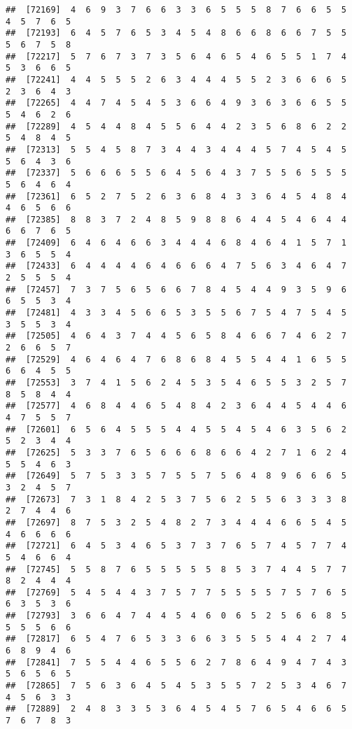 \documentclass[
]{book}
\begin{document}
\begin{verbatim}
##  [72169]  4  6  9  3  7  6  6  3  3  6  5  5  5  8  7  6  6  5  5  4  5  7  6  5
##  [72193]  6  4  5  7  6  5  3  4  5  4  8  6  6  8  6  6  7  5  5  5  6  7  5  8
##  [72217]  5  7  6  7  3  7  3  5  6  4  6  5  4  6  5  5  1  7  4  5  3  6  6  5
##  [72241]  4  4  5  5  5  2  6  3  4  4  4  5  5  2  3  6  6  6  5  2  3  6  4  3
##  [72265]  4  4  7  4  5  4  5  3  6  6  4  9  3  6  3  6  6  5  5  5  4  6  2  6
##  [72289]  4  5  4  4  8  4  5  5  6  4  4  2  3  5  6  8  6  2  2  5  4  8  4  5
##  [72313]  5  5  4  5  8  7  3  4  4  3  4  4  4  5  7  4  5  4  5  5  6  4  3  6
##  [72337]  5  6  6  6  5  5  6  4  5  6  4  3  7  5  5  6  5  5  5  5  6  4  6  4
##  [72361]  6  5  2  7  5  2  6  3  6  8  4  3  3  6  4  5  4  8  4  4  6  5  6  6
##  [72385]  8  8  3  7  2  4  8  5  9  8  8  6  4  4  5  4  6  4  4  6  6  7  6  5
##  [72409]  6  4  6  4  6  6  3  4  4  4  6  8  4  6  4  1  5  7  1  3  6  5  5  4
##  [72433]  6  4  4  4  4  6  4  6  6  6  4  7  5  6  3  4  6  4  7  2  5  5  5  4
##  [72457]  7  3  7  5  6  5  6  6  7  8  4  5  4  4  9  3  5  9  6  6  5  5  3  4
##  [72481]  4  3  3  4  5  6  6  5  3  5  5  6  7  5  4  7  5  4  5  3  5  5  3  4
##  [72505]  4  6  4  3  7  4  4  5  6  5  8  4  6  6  7  4  6  2  7  2  6  6  5  7
##  [72529]  4  6  4  6  4  7  6  8  6  8  4  5  5  4  4  1  6  5  5  6  6  4  5  5
##  [72553]  3  7  4  1  5  6  2  4  5  3  5  4  6  5  5  3  2  5  7  8  5  8  4  4
##  [72577]  4  6  8  4  4  6  5  4  8  4  2  3  6  4  4  5  4  4  6  4  7  5  5  7
##  [72601]  6  5  6  4  5  5  5  4  4  5  5  4  5  4  6  3  5  6  2  5  2  3  4  4
##  [72625]  5  3  3  7  6  5  6  6  6  8  6  6  4  2  7  1  6  2  4  5  5  4  6  3
##  [72649]  5  7  5  3  3  5  7  5  5  7  5  6  4  8  9  6  6  6  5  3  2  4  5  7
##  [72673]  7  3  1  8  4  2  5  3  7  5  6  2  5  5  6  3  3  3  8  2  7  4  4  6
##  [72697]  8  7  5  3  2  5  4  8  2  7  3  4  4  4  6  6  5  4  5  4  6  6  6  6
##  [72721]  6  4  5  3  4  6  5  3  7  3  7  6  5  7  4  5  7  7  4  5  4  6  6  4
##  [72745]  5  5  8  7  6  5  5  5  5  5  8  5  3  7  4  4  5  7  7  8  2  4  4  4
##  [72769]  5  4  5  4  4  3  7  5  7  7  5  5  5  5  7  5  7  6  5  6  3  5  3  6
##  [72793]  3  6  6  4  7  4  4  5  4  6  0  6  5  2  5  6  6  8  5  5  5  5  6  6
##  [72817]  6  5  4  7  6  5  3  3  6  6  3  5  5  5  4  4  2  7  4  6  8  9  4  6
##  [72841]  7  5  5  4  4  6  5  5  6  2  7  8  6  4  9  4  7  4  3  5  6  5  6  5
##  [72865]  7  5  6  3  6  4  5  4  5  3  5  5  7  2  5  3  4  6  7  4  5  6  3  3
##  [72889]  2  4  8  3  3  5  3  6  4  5  4  5  7  6  5  4  6  6  5  7  6  7  8  3

\end{verbatim}
\end{document}
